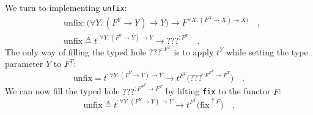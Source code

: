 We turn to implementing \lstinline!unfix!:
\begin{align*}
 & \text{unfix}:\big(\forall Y.\,(F^{Y}\rightarrow Y)\rightarrow Y\big)\rightarrow F^{\forall X.\,(F^{X}\rightarrow X)\rightarrow X\big)}\quad,\\
 & \text{unfix}\triangleq t^{:\forall Y.\,(F^{Y}\rightarrow Y)\rightarrow Y}\rightarrow\text{???}^{:F^{T}}\quad.
\end{align*}
The only way of filling the typed hole $\text{???}^{:F^{T}}$ is to
apply $t^{Y}$ while setting the type parameter $Y$ to $F^{T}$:
\[
\text{unfix}=t^{:\forall Y.\,(F^{Y}\rightarrow Y)\rightarrow Y}\rightarrow t^{F^{T}}\big(\text{???}^{:F^{F^{T}}\rightarrow F^{T}}\big)\quad.
\]
We can now fill the typed hole $\text{???}^{:F^{F^{T}}\rightarrow F^{T}}$
by lifting \lstinline!fix!
to the functor $F$:
\[
\text{unfix}\triangleq t^{:\forall Y.\,(F^{Y}\rightarrow Y)\rightarrow Y}\rightarrow t^{F^{T}}\big(\text{fix}^{\uparrow F}\big)\quad.
\]

